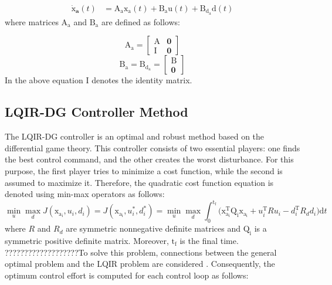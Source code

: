\documentclass[3p,times]{elsarticle}
\begin{document}
\begin{equation}\label{systemlqidg}
	\begin{split}
		\boldsymbol{\dot{\mathrm{x}}_a}(t) &= \boldsymbol{\mathrm{A_ax_a}}(t) + \boldsymbol{\mathrm{B_{{a}}u}}(t) + \boldsymbol{\mathrm{B_{{d_a}}d}}(t)%
	\end{split}
\end{equation}
where matrices $\boldsymbol{\mathrm{A_a}}$ and $\boldsymbol{\mathrm{B_a}}$ are defined as follows:

\begin{equation}
	\boldsymbol{\mathrm{A_a}} = \begin{bmatrix}
		\boldsymbol{\mathrm{A}} & \boldsymbol{0}\\
		\boldsymbol{\mathrm{I}} & \boldsymbol{0}
	\end{bmatrix}
\end{equation}
\begin{equation}
	\boldsymbol{\mathrm{B_a}} = \boldsymbol{\mathrm{B_{{d_a}}}} = \begin{bmatrix}
		\boldsymbol{\mathrm{B}}\\
		\boldsymbol{0}
	\end{bmatrix}
\end{equation}
In the above equation $\boldsymbol{\mathrm{I}}$ denotes the identity matrix.

\subsection{LQIR-DG Controller Method}
\noindent The LQIR-DG controller is an optimal and robust method based on the differential game theory. This controller consists of two essential players: one finds the best control command, and the other creates the worst disturbance. 
For this purpose, the first player tries to minimize a cost function, while the second is assumed to maximize it. Therefore, the quadratic cost function equation is denoted using min-max operators as follows:
\begin{equation}
    \min_{u} \max_{d} J(\boldsymbol{\mathrm{x_{a_i}}}, {u_i}, {d_i}) = J(\boldsymbol{\mathrm{x_{a_i}}}, {u^*_i}, {d^*_i})=\min_{u} \max_{d}
     \int_{0}^{\mathrm{t_f}}\biggl (\boldsymbol{\mathrm{x^\mathrm{T}_{a_i}}}  \boldsymbol{\mathrm{Q_i}} \boldsymbol{\mathrm{x_{a_i}}}+
    {{u^\mathrm{T}_i}}  {{R}} {{u_i}}-
    {{d^\mathrm{T}_{i}}} {{ R_{d} d_{i}}}
    \biggl )\mathrm{d}t
\end{equation}
where ${{ R}}$ and ${{R_{d}}}$ are symmetric nonnegative definite matrices and $\boldsymbol{\mathrm{Q_i}} $ is a symmetric positive definite matrix.  Moreover, $\mathrm{t_f}$ is the final time. ???????????????????To solve this problem, connections between the general optimal problem and the LQIR problem are considered \cite{LQDG}. Consequently, the optimum control effort is computed for each control loop as follows:
\end{document}
